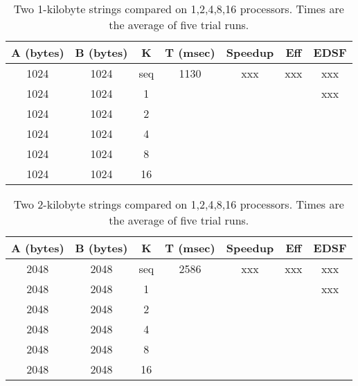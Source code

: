 \begin{table}[h]
	\begin{center}
		\begin{tabular}{ | c | c | c | c | c | c | c |}
			\hline 
			A (bytes)&	B (bytes) &	K	&	T (msec)	&	Speedup	&	Eff	&	EDSF \\
			\hline		
			1024    &	1024    &	seq	&	1130  		&	xxx		&	xxx	&	xxx \\
			1024    &	1024    &	1	&	 	 		&			&		&	xxx \\
			1024    &	1024    &	2	&	 	 	 	&			&		&\\
			1024    &	1024    &	4	&	 	 	 	&			&		&\\
			1024    &	1024    &	8	&	 	 	 	&			&		&\\
			1024    &	1024    &	16	&	 	 	 	&			&		&\\
			\hline
		\end{tabular}
	\end{center}
	\caption{Two 1-kilobyte strings compared on {1,2,4,8,16} processors. Times are the average of five trial runs.}
\end{table}

\begin{table}[h]
	\begin{center}
		\begin{tabular}{ | c | c | c | c | c | c | c |}
			\hline 
			A (bytes)&	B (bytes) &	K	&	T (msec)	&	Speedup	&	Eff	&	EDSF \\
			\hline		
			2048    &	2048    &	seq	&	2586  		&	xxx		&	xxx	&	xxx \\
			2048   	&	2048   	&	1	&	 	 		&			&		&	xxx \\
			2048   	&	2048   	&	2	&	 	 	 	&			&		&\\
			2048   	&	2048   	&	4	&	 	 	 	&			&		&\\
			2048   	&	2048   	&	8	&	 	 	 	&			&		&\\
			2048   	&	2048   	&	16	&	 	 	 	&			&		&\\
			\hline
		\end{tabular}
	\end{center}
	\caption{Two 2-kilobyte strings compared on {1,2,4,8,16} processors. Times are the average of five trial runs.}
\end{table}



